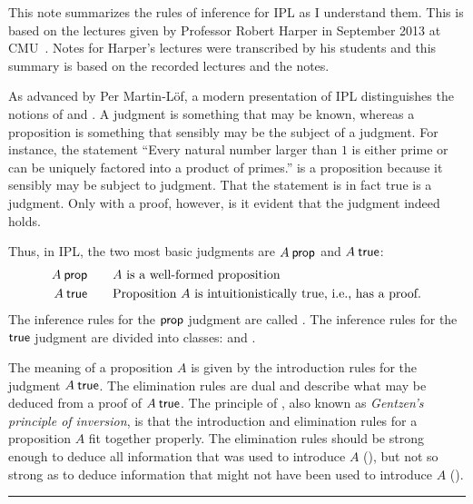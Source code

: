 \documentclass{article}
\begin{document}
This note summarizes the rules of inference for \ac{IPL} as I understand them.
This is based on the lectures given by Professor Robert Harper in September
2013 at CMU~\cite{Harper2012}. 
Notes for Harper's lectures were transcribed by his students and
this summary is based on the recorded lectures and the notes. 

As advanced by Per Martin-L\"{o}f, a modern presentation of \ac{IPL}
distinguishes the notions of  and . A
judgment is something that may be known, whereas a proposition is something that
sensibly may be the subject of a judgment. For instance, the statement ``Every
natural number larger than $1$ is either prime or can be uniquely factored into
a product of primes\@.'' is a proposition because it sensibly may be subject to
judgment. That the statement is in fact true is a judgment.
Only with a proof, however, is it evident that the judgment indeed holds.

Thus, in \ac{IPL}, the two most basic judgments are $A \prop$ and $A \true$:
\begin{alignat*}{2}
  A \prop &&\quad& \text{$A$ is a well-formed proposition} \\
  A \true &&& \text{\begin{tabular}[t]{@{}l@{}}
                Proposition $A$ is intuitionistically true, i.e., has a proof.
              \end{tabular}}
\end{alignat*}
The inference rules for the $\prop$ judgment are called .
The inference rules for the $\true$ judgment are divided into classes:
 and . 

The meaning of a proposition $A$ is given by the introduction rules for the
judgment $A \true$. The elimination rules are dual and  describe what may be
deduced from a proof of $A \true$.  The principle of ,
also known as \emph{Gentzen's principle of inversion}, is that the introduction
and elimination rules for a proposition $A$ fit together properly.  The
elimination rules should be strong enough to deduce all information that was
used to introduce $A$ (), but not so strong as to
deduce information that might not have been used to introduce $A$ (). 

\medskip 

\hrule
\end{document}

